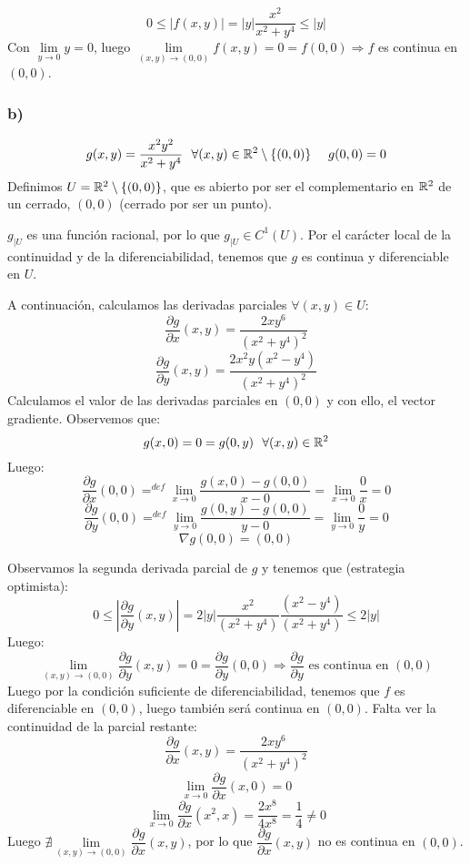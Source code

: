 $$0 \leq |f(x,y)| = |y|\dfrac{x^2}{x^2+y^4} \leq |y|$$
Con $\lim\limits_{y \to 0}y = 0$, luego $\lim\limits_{(x,y) \to (0,0)} f(x,y) = 0 = f(0,0) \Rightarrow f$ es continua en $(0,0)$.

\subsubsection{b)}
$$g(x,y) = \dfrac{x^2y^2}{x^2+y^4}~~\forall (x,y) \in \mathbb R^2 \setminus \{(0,0)\}~~~~g(0,0) = 0$$
Definimos $U = \mathbb R^2 \setminus \{(0,0)\}$, que es abierto por ser el complementario en $\mathbb R^2$ de un cerrado, ${(0,0)}$ (cerrado por ser un punto).
\vspace{.5cm}

\noindent
$g_{|U}$ es una función racional, por lo que $g_{|U} \in C^1(U)$. Por el carácter local de la continuidad y de la diferenciabilidad, tenemos que $g$ es continua y diferenciable en $U$.
\vspace{.5cm}

\noindent
A continuación, calculamos las derivadas parciales $\forall (x,y) \in U$:
$$\dfrac{\partial g}{\partial x}(x,y) = \dfrac{2xy^6}{(x^2+y^4)^2}$$
$$\dfrac{\partial g}{\partial y}(x,y) = \dfrac{2x^2y(x^2-y^4)}{(x^2+y^4)^2}$$
Calculamos el valor de las derivadas parciales en $(0,0)$ y con ello, el vector gradiente. Observemos que:
$$g(x,0) = 0 = g(0,y)~~\forall(x,y) \in \mathbb R^2$$
Luego:
$$\dfrac{\partial g}{\partial x}(0,0) \mathop{=}^{def} \lim_{x \to 0} \dfrac{g(x,0)-g(0,0)}{x-0} = \lim_{x \to 0} \dfrac{0}{x} = 0$$
$$\dfrac{\partial g}{\partial y}(0,0) \mathop{=}^{def} \lim_{y \to 0} \dfrac{g(0,y)-g(0,0)}{y-0} = \lim_{y \to 0} \dfrac{0}{y} = 0$$
$$\nabla g(0,0) = (0,0)$$
\vspace{.5cm}

\noindent
Observamos la segunda derivada parcial de $g$ y tenemos que (estrategia optimista):
$$0 \leq \left| \dfrac{\partial g}{\partial y}(x,y) \right| = 2|y| \dfrac{x^2}{(x^2+y^4)}
\dfrac{(x^2-y^4)}{(x^2+y^4)} \leq 2|y|$$
Luego:
$$\lim_{(x,y) \to (0,0)} \dfrac{\partial g}{\partial y}(x,y) = 0 = \dfrac{\partial g}{\partial y}(0,0) \Rightarrow \dfrac{\partial g}{\partial y} \mbox{ es continua en } (0,0)$$
Luego por la condición suficiente de diferenciabilidad, tenemos que $f$ es diferenciable en $(0,0)$, luego también será continua en $(0,0)$. Falta ver la continuidad de la parcial restante:
$$\dfrac{\partial g}{\partial x}(x,y) = \dfrac{2xy^6}{(x^2+y^4)^2}$$
$$\lim_{x \to 0}\dfrac{\partial g}{\partial x}(x,0) = 0$$
$$\lim_{x \to 0}\dfrac{\partial g}{\partial x}(x^2, x) = \dfrac{2x^8}{4x^8} = \dfrac{1}{4} \neq 0$$
Luego $\nexists \lim\limits_{(x,y) \to (0,0)}\dfrac{\partial g}{\partial x}(x,y)$, por lo que $\dfrac{\partial g}{\partial x}(x,y)$ no es continua en $(0,0)$.